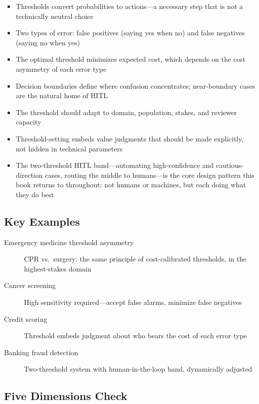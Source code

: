 \begin{keyconcept}
\begin{itemize}
    \item Thresholds convert probabilities to actions---a necessary step that is not a technically neutral choice
    \item Two types of error: false positives (saying yes when no) and false negatives (saying no when yes)
    \item The optimal threshold minimizes expected cost, which depends on the cost asymmetry of each error type
    \item Decision boundaries define where confusion concentrates; near-boundary cases are the natural home of HITL
    \item The threshold should adapt to domain, population, stakes, and reviewer capacity
    \item Threshold-setting embeds value judgments that should be made explicitly, not hidden in technical parameters
    \item The two-threshold HITL band---automating high-confidence and cautious-direction cases, routing the middle to humans---is the core design pattern this book returns to throughout: not humans or machines, but each doing what they do best
\end{itemize}
\end{keyconcept}

\subsection*{Key Examples}

\begin{description}
    \item[Emergency medicine threshold asymmetry] CPR vs.\ surgery: the same principle of cost-calibrated thresholds, in the highest-stakes domain
    \item[Cancer screening] High sensitivity required---accept false alarms, minimize false negatives
    \item[Credit scoring] Threshold embeds judgment about who bears the cost of each error type
    \item[Banking fraud detection] Two-threshold system with human-in-the-loop band, dynamically adjusted
\end{description}

\subsection*{Five Dimensions Check}

